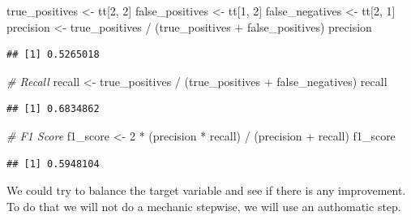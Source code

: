 \documentclass[
  twoside]{article}
\newenvironment{Shaded}{\begin{snugshade}}{\end{snugshade}}
\newcommand{\CommentTok}[1]{\textcolor[rgb]{0.56,0.35,0.01}{\textit{#1}}}
\newcommand{\DecValTok}[1]{\textcolor[rgb]{0.00,0.00,0.81}{#1}}
\newcommand{\FunctionTok}[1]{\textcolor[rgb]{0.00,0.00,0.00}{#1}}
\newcommand{\NormalTok}[1]{#1}
\newcommand{\OtherTok}[1]{\textcolor[rgb]{0.56,0.35,0.01}{#1}}
\newcommand{\SpecialCharTok}[1]{\textcolor[rgb]{0.00,0.00,0.00}{#1}}
\begin{document}
\begin{Shaded}
\begin{Highlighting}[]
\NormalTok{true\_positives }\OtherTok{\textless{}{-}}\NormalTok{ tt[}\DecValTok{2}\NormalTok{, }\DecValTok{2}\NormalTok{]}
\NormalTok{false\_positives }\OtherTok{\textless{}{-}}\NormalTok{ tt[}\DecValTok{1}\NormalTok{, }\DecValTok{2}\NormalTok{]}
\NormalTok{false\_negatives }\OtherTok{\textless{}{-}}\NormalTok{ tt[}\DecValTok{2}\NormalTok{, }\DecValTok{1}\NormalTok{]}
\NormalTok{precision }\OtherTok{\textless{}{-}}\NormalTok{ true\_positives }\SpecialCharTok{/}\NormalTok{ (true\_positives }\SpecialCharTok{+}\NormalTok{ false\_positives)}
\NormalTok{precision}
\end{Highlighting}
\end{Shaded}

\begin{verbatim}
## [1] 0.5265018
\end{verbatim}

\begin{Shaded}
\begin{Highlighting}[]
\CommentTok{\# Recall}
\NormalTok{recall }\OtherTok{\textless{}{-}}\NormalTok{ true\_positives }\SpecialCharTok{/}\NormalTok{ (true\_positives }\SpecialCharTok{+}\NormalTok{ false\_negatives)}
\NormalTok{recall}
\end{Highlighting}
\end{Shaded}

\begin{verbatim}
## [1] 0.6834862
\end{verbatim}

\begin{Shaded}
\begin{Highlighting}[]
\CommentTok{\# F1 Score}
\NormalTok{f1\_score }\OtherTok{\textless{}{-}} \DecValTok{2} \SpecialCharTok{*}\NormalTok{ (precision }\SpecialCharTok{*}\NormalTok{ recall) }\SpecialCharTok{/}\NormalTok{ (precision }\SpecialCharTok{+}\NormalTok{ recall)}
\NormalTok{f1\_score}
\end{Highlighting}
\end{Shaded}

\begin{verbatim}
## [1] 0.5948104
\end{verbatim}

We could try to balance the target variable and see if there is any
improvement. To do that we will not do a mechanic stepwise, we will use
an authomatic step.

\begin{Shaded}
\end{Shaded}
\end{document}
